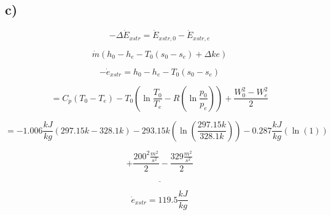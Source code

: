 

\subsection*{c)}

\[
-\Delta \dot{E}_{xstr} = \dot{E}_{xstr,0} - \dot{E}_{xstr,e}
\]

\[
\dot{m} (h_0 - h_e - T_0 (s_0 - s_e) + \Delta ke)
\]

\[
-\dot{e}_{xstr} = h_0 - h_e - T_0 (s_0 - s_e)
\]

\[
= C_p (T_0 - T_e) - T_0 \left( \ln \frac{T_0}{T_e} - R \left( \ln \frac{p_0}{p_e} \right) \right) + \frac{W_0^2 - W_e^2}{2}
\]

\[
= -1.006 \frac{kJ}{kg} \left( 297.15k - 328.1k \right) - 293.15k \left( \ln \left( \frac{297.15k}{328.1k} \right) \right) - 0.287 \frac{kJ}{kg} \left( \ln (1) \right)
\]

\[
+ \frac{200^2 \frac{m^2}{s^2}}{2} - \frac{329 \frac{m^2}{s^2}}{2}
\]

\[
\underline{\hspace{5cm}}
\]

\[
\dot{e}_{xstr} = 119.5 \frac{kJ}{kg}
\]